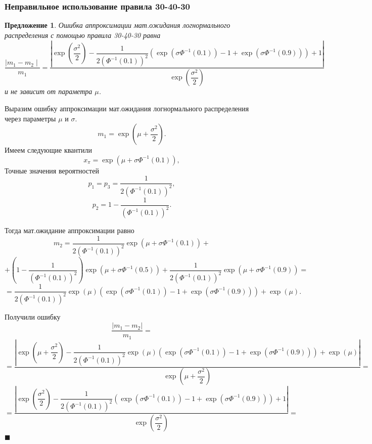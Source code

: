 \documentclass[12pt]{article}
\newtheorem{proposition}[theorem]{Предложение}
\newenvironment{Proof}{\par\noindent{\bf Доказательство.}}{\hfill$\scriptstyle\blacksquare$}
\begin{document}
\subsubsection{Неправильное использование правила 30-40-30}

\begin{proposition}\label{pr5}
	Ошибка аппроксимации мат.ожидания логнормального распределения с помощью правила 30-40-30 равна
	\[\dfrac{\mid m_{1} - m_{2} \mid}{m_{1}} = \dfrac{\left|\exp\left(\dfrac{\sigma^{2}}{2}\right) - \dfrac{1}{2(\Phi^{-1}(0.1))^{2}}\left(\exp(\sigma\Phi^{-1}(0.1))-1 +\exp(\sigma\Phi^{-1}(0.9))\right) + 1\right|}{\exp\left(\dfrac{\sigma^{2}}{2}\right)}\]
	и не зависит от параметра $\mu$.
\end{proposition}
\begin{Proof}
	Выразим ошибку аппроксимации мат.ожидания логнормального распределения через параметры $\mu$ и $\sigma$.
	\[m_{1} = \exp\left(\mu+\dfrac{\sigma^{2}}{2}\right).\]
	Имеем следующие квантили
	\[x_{\pi} = \exp(\mu+\sigma\Phi^{-1}(0.1)),\]
	Точные значения вероятностей
	\[p_{1} = p_{3} = \dfrac{1}{2(\Phi^{-1}(0.1))^{2}},\]
	\[p_{2} = 1 - \dfrac{1}{(\Phi^{-1}(0.1))^{2}}.\]
	
	Тогда мат.ожидание аппроксимации равно
	\[m_{2} = \dfrac{1}{2(\Phi^{-1}(0.1))^{2}}\exp(\mu+\sigma\Phi^{-1}(0.1))+\]
	\[+\left(1 - \dfrac{1}{(\Phi^{-1}(0.1))^{2}}\right)\exp(\mu+\sigma\Phi^{-1}(0.5))+ \dfrac{1}{2(\Phi^{-1}(0.1))^{2}}\exp(\mu+\sigma\Phi^{-1}(0.9))=\]
	\[= \dfrac{1}{2(\Phi^{-1}(0.1))^{2}} \exp(\mu)(\exp(\sigma\Phi^{-1}(0.1))-1+\exp(\sigma\Phi^{-1}(0.9))) + \exp(\mu). \]
	
	Получили ошибку
	\[\dfrac{\left| m_{1} - m_{2} \right|}{m_{1}} = \]\[=\dfrac{\left| \exp\left(\mu+\dfrac{\sigma^{2}}{2}\right) - \dfrac{1}{2(\Phi^{-1}(0.1))^{2}} \exp(\mu)(\exp(\sigma\Phi^{-1}(0.1))-1 +\exp(\sigma\Phi^{-1}(0.9))) + \exp(\mu) \right|}{\exp\left(\mu+\dfrac{\sigma^{2}}{2}\right)}=\]
	\[=\dfrac{\left| \exp\left(\dfrac{\sigma^{2}}{2}\right) - \dfrac{1}{2(\Phi^{-1}(0.1))^{2}} (\exp(\sigma\Phi^{-1}(0.1))-1 +\exp(\sigma\Phi^{-1}(0.9))) + 1 \right|}{\exp\left(\dfrac{\sigma^{2}}{2}\right)}=\]
\end{Proof}
\end{document}
